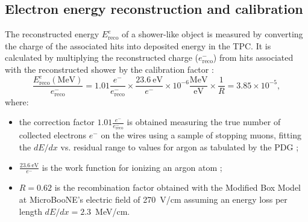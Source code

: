 \subsection{Electron energy reconstruction and calibration}\label{sec:showerenergy}
The reconstructed energy $E_{\mathrm{reco}}^{e}$ of a shower-like object is measured by converting the charge of the associated hits into deposited energy in the TPC. It is calculated by multiplying the reconstructed charge ($e^{-}_{\mathrm{reco}}$) from hits associated with the reconstructed shower by the calibration factor \cite{Acciarri:2017sjy}:
\begin{equation}
\frac{E_{\mathrm{reco}}^{e} \mathrm{(MeV)}}{e^{-}_{\mathrm{reco}}} = 1.01\frac{e^-}{e^{-}_{\mathrm{reco}}} \times \frac{23.6~\mathrm{eV}}{e^-} \times 10^{-6} \frac{\mathrm{MeV}}{\mathrm{eV}} \times \frac{1}{R} = 3.85\times10^{-5},\label{eq:calib}
\end{equation}
where:
\begin{itemize}

\item the correction factor $1.01\frac{e^-}{e^{-}_{\mathrm{reco}}}$ is obtained measuring the true number of collected electrons $e^{-}$ on the wires using a sample of stopping muons, fitting the $dE/dx$ vs. residual range to values for argon as tabulated by the PDG \cite{PhysRevD.98.030001};
\item $\frac{23.6~\mathrm{eV}}{e^-}$ is the work function for ionizing an argon atom \cite{Shibamura:1975zz};
\item $R = 0.62$ is the recombination factor obtained with the Modified Box Model \cite{Acciarri:2013met} at MicroBooNE's electric field of 270~V/cm assuming an energy loss per length $dE/dx=2.3$~MeV/cm.
\end{itemize}

